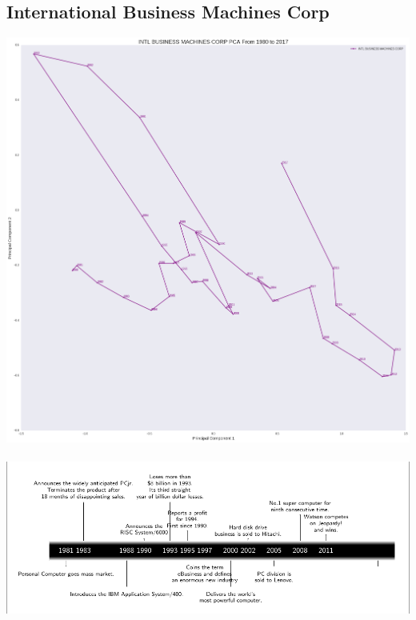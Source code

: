 \subsection{International Business Machines Corp}
\includegraphics[width=1\textwidth]{./IBM}\\[0.1in] \\
\includegraphics[width=1\textwidth]{./IBMtimeline}\\[0.1in] \\

